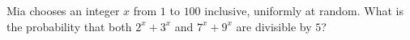 Mia chooses an integer $x$ from $1$ to $100$ inclusive, uniformly at random. What is the probability that both $2^x+3^x$ and $7^x+9^x$ are divisible by $5$?
